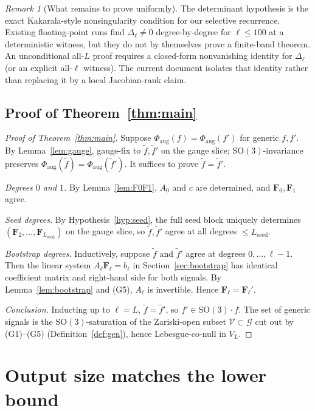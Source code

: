 \documentclass[11pt]{article}
\theoremstyle{plain}
\theoremstyle{definition}
\theoremstyle{remark}
\newtheorem{remark}[theorem]{Remark}
\newcommand{\SO}{\mathrm{SO}}
\newcommand{\Phiaug}{\Phi_{\mathrm{aug}}}
\begin{document}
\begin{remark}[What remains to prove uniformly]\label{rem:uniform-gap}
The determinant hypothesis is the exact Kakarala-style nonsingularity
condition for our selective recurrence. Existing floating-point runs
find $\Delta_\ell\ne0$ degree-by-degree for $\ell\le100$ at a
deterministic witness, but they do not by themselves prove a
finite-band theorem.
An unconditional all-$L$ proof requires a closed-form nonvanishing
identity for $\Delta_\ell$ (or an explicit all-$\ell$ witness). The
current document isolates that identity rather than replacing it by a
local Jacobian-rank claim.
\end{remark}

\subsection{Proof of Theorem~\ref{thm:main}}
\label{sec:proof}

\begin{proof}[Proof of Theorem~\ref{thm:main}]
Suppose $\Phiaug(f)=\Phiaug(f')$ for generic $f,f'$. By
Lemma~\ref{lem:gauge}, gauge-fix to $\tilde f,\tilde f'$ on the gauge
slice; $\SO(3)$-invariance preserves
$\Phiaug(\tilde f)=\Phiaug(\tilde f')$. It suffices to prove
$\tilde f=\tilde f'$.

\emph{Degrees $0$ and $1$.} By Lemma~\ref{lem:F0F1}, $A_0$ and $c$ are
determined, and $\mathbf{F}_0,\mathbf{F}_1$ agree.

\emph{Seed degrees.} By Hypothesis~\ref{hyp:seed}, the full seed block
uniquely determines
$(\mathbf{F}_2,\dots,\mathbf{F}_{L_{\mathrm{seed}}})$ on the gauge
slice, so $\tilde f,\tilde f'$ agree at all degrees
$\le L_{\mathrm{seed}}$.

\emph{Bootstrap degrees.} Inductively, suppose $\tilde f$ and
$\tilde f'$ agree at degrees $0,\dotsc,\ell{-}1$. Then the linear
system $A_\ell\mathbf{F}_\ell=b_\ell$ in
Section~\ref{sec:bootstrap} has identical coefficient matrix and
right-hand side for both signals. By Lemma~\ref{lem:bootstrap} and
(G5), $A_\ell$ is invertible. Hence
$\mathbf{F}_\ell=\mathbf{F}_\ell'$.

\emph{Conclusion.} Inducting up to $\ell=L$, $\tilde f=\tilde f'$, so
$f'\in\SO(3)\cdot f$. The set of generic signals is the
$\SO(3)$-saturation of the Zariski-open subset
$\mathcal{V}\subset\mathcal{G}$ cut out by (G1)--(G5)
(Definition~\ref{def:gen}), hence Lebesgue-co-null in $V_L$.
\end{proof}

\section{Output size matches the lower bound}
\label{sec:size}
\end{document}
